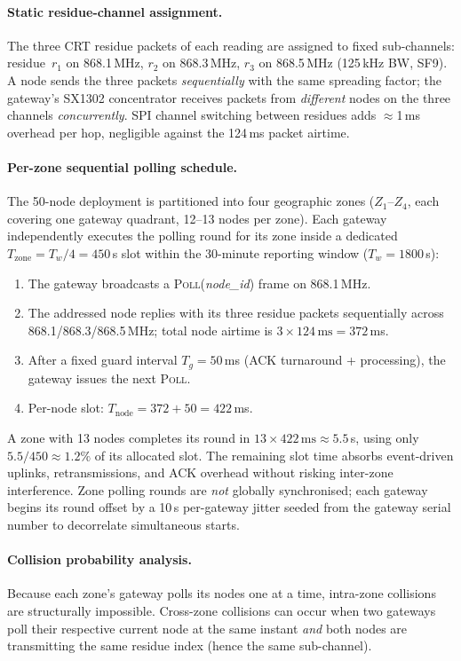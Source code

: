 \documentclass[pdflatex,sn-mathphys-num]{sn-jnl}
\theoremstyle{thmstyleone}
\theoremstyle{thmstyletwo}
\theoremstyle{thmstylethree}
\begin{document}
\paragraph{Static residue-channel assignment.}
The three CRT residue packets of each reading are assigned to fixed sub-channels: residue~$r_1$ on 868.1\,MHz, $r_2$ on 868.3\,MHz, $r_3$ on 868.5\,MHz (125\,kHz BW, SF9). A node sends the three packets \emph{sequentially} with the same spreading factor; the gateway's SX1302 concentrator receives packets from \emph{different} nodes on the three channels \emph{concurrently}. SPI channel switching between residues adds $\approx$1\,ms overhead per hop, negligible against the 124\,ms packet airtime.

\paragraph{Per-zone sequential polling schedule.}
The 50-node deployment is partitioned into four geographic zones ($Z_1$--$Z_4$, each covering one gateway quadrant, 12--13 nodes per zone). Each gateway independently executes the polling round for its zone inside a dedicated $T_{\text{zone}} = T_w/4 = 450$\,s slot within the 30-minute reporting window ($T_w = 1800$\,s):
\begin{enumerate}
  \item The gateway broadcasts a \textsc{Poll}(\textit{node\_id}) frame on 868.1\,MHz.
  \item The addressed node replies with its three residue packets sequentially across 868.1/868.3/868.5\,MHz; total node airtime is $3 \times 124\,\text{ms} = 372$\,ms.
  \item After a fixed guard interval $T_g = 50$\,ms (ACK turnaround + processing), the gateway issues the next \textsc{Poll}.
  \item Per-node slot: $T_{\text{node}} = 372 + 50 = 422$\,ms.
\end{enumerate}
A zone with 13 nodes completes its round in $13 \times 422\,\text{ms} \approx 5.5$\,s, using only $5.5/450 \approx 1.2\%$ of its allocated slot. The remaining slot time absorbs event-driven uplinks, retransmissions, and ACK overhead without risking inter-zone interference. Zone polling rounds are \emph{not} globally synchronised; each gateway begins its round offset by a 10\,s per-gateway jitter seeded from the gateway serial number to decorrelate simultaneous starts.

\paragraph{Collision probability analysis.}
Because each zone's gateway polls its nodes one at a time, intra-zone collisions are structurally impossible. Cross-zone collisions can occur when two gateways poll their respective current node at the same instant \emph{and} both nodes are transmitting the same residue index (hence the same sub-channel).
\end{document}
